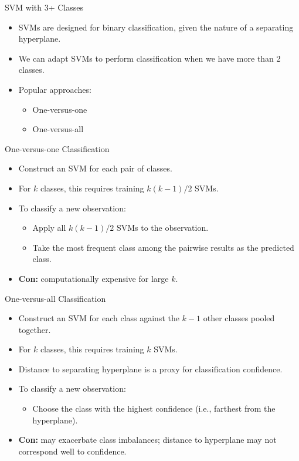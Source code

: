 \begin{frame}{SVM with 3+ Classes}

\begin{itemize}
    \item SVMs are designed for binary classification, given the nature of a separating hyperplane.
    \item We can adapt SVMs to perform classification when we have more than 2 classes.
    \item Popular approaches:
    \begin{itemize}
        \item One-versus-one
        \item One-versus-all
    \end{itemize}
\end{itemize}

\end{frame}


\begin{frame}{One-versus-one Classification}

\begin{itemize}
    \item Construct an SVM for each pair of classes.
    \item For $k$ classes, this requires training $k(k-1)/2$ SVMs.
    \item To classify a new observation:
    \begin{itemize}
        \item Apply all $k(k-1)/2$ SVMs to the observation.
        \item Take the most frequent class among the pairwise results as the predicted class.
    \end{itemize}
    \item \textbf{Con:} computationally expensive for large $k$.
\end{itemize}

\end{frame}


\begin{frame}{One-versus-all Classification}

\begin{itemize}
    \item Construct an SVM for each class against the $k-1$ other classes pooled together.
    \item For $k$ classes, this requires training $k$ SVMs.
    \item Distance to separating hyperplane is a proxy for classification confidence.
    \item To classify a new observation:
    \begin{itemize}
        \item Choose the class with the highest confidence (i.e., farthest from the hyperplane).
    \end{itemize}
    \item \textbf{Con:} may exacerbate class imbalances; distance to hyperplane may not correspond well to confidence.
\end{itemize}

\end{frame}
